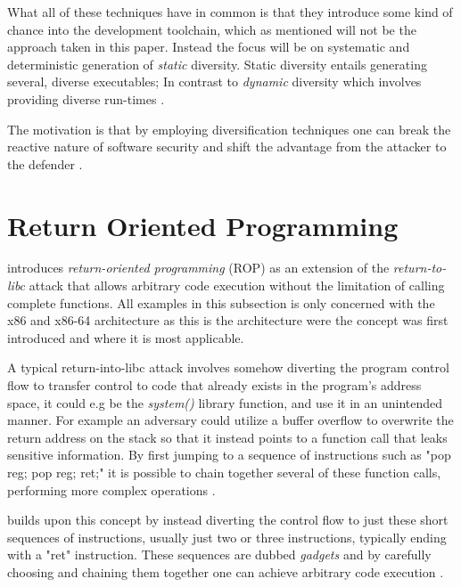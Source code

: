 What all of these techniques have in common is that they introduce some kind of chance into
the development toolchain, which as mentioned will not be the approach taken in this paper.
Instead the focus will be on systematic and deterministic generation of \textit{static}
diversity. Static diversity entails generating several, diverse executables; In contrast
to \textit{dynamic} diversity which involves providing diverse run-times \cite{survey}.

The motivation is that by employing diversification techniques one can break the
reactive nature of software security and shift the advantage from the attacker to the
defender \cite{compiler-generated-sw-div}.

\section{Return Oriented Programming}
\label{rop}

\textcite{rop} introduces \textit{return-oriented programming} (ROP) as an extension of
the \textit{return-to-libc} \cite{return-into-libc} attack that allows arbitrary code
execution without the limitation of calling complete functions. All examples in this
subsection is only concerned with the x86 and x86-64 architecture as this is the
architecture were the concept was first introduced and where it is most applicable.

A typical return-into-libc attack involves somehow diverting the program control
flow to transfer control to code that already exists in the program's address space,
it could e.g be the \textit{system()} library function, and use it in an unintended manner.
For example an adversary could utilize a buffer overflow to overwrite the return address on
the stack so that it instead points to a function call that leaks sensitive information.
By first jumping to a sequence of instructions such as "pop reg; pop reg; ret;" it is
possible to chain together several of these function calls, performing more complex
operations \cite{non-exec-stack,advanced-return-into-libc}.

\textcite{rop} builds upon this concept by instead diverting the control flow to just these
short sequences of instructions, usually just two or three instructions, typically ending
with a "ret" instruction. These sequences are dubbed \textit{gadgets} and by carefully
choosing and chaining them together one can achieve arbitrary code execution \cite{rop}.

